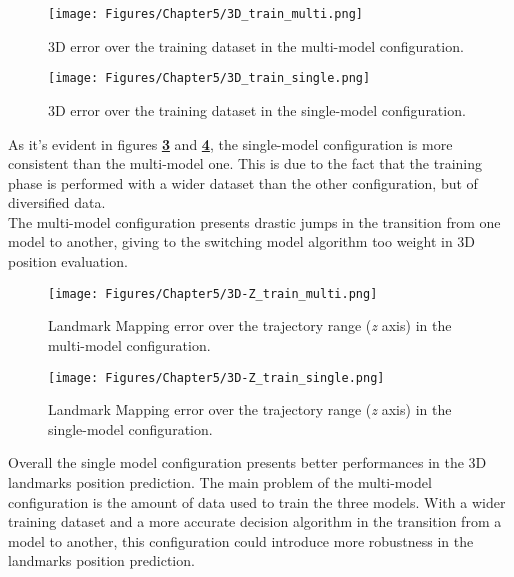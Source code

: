\begin{figure}[H]
    \centering
    \texttt{[image: Figures/Chapter5/3D\_train\_multi.png]}
    \caption[Landmark Mapping error multi-model configuration.]{3D error over the training dataset in the multi-model configuration.}
    \label{fig:3D train multi}
\end{figure}
\begin{figure}[H]
    \centering
    \texttt{[image: Figures/Chapter5/3D\_train\_single.png]}
    \caption[Landmark Mapping error single-model configuration.]{3D error over the training dataset in the single-model configuration.}
    \label{fig:3D train single}
\end{figure}
\newpage
As it's evident in figures \textbf{\ref{fig:3D-Z train multi}} and \textbf{\ref{fig:3D-Z train single}}, the single-model configuration is more consistent than the multi-model one. This is due to the fact that the training phase is performed with a wider dataset than the other configuration, but of diversified data.\\
The multi-model configuration presents drastic jumps in the transition from one model to another, giving to the switching model algorithm too weight in 3D position evaluation.
\begin{figure}[H]
    \centering
    \texttt{[image: Figures/Chapter5/3D-Z\_train\_multi.png]}
    \caption[Landmark Mapping error over the trajectory range in multi-model configuration.]{Landmark Mapping error over the trajectory range (\textit{z} axis) in the multi-model configuration.}
    \label{fig:3D-Z train multi}
\end{figure}

\begin{figure}[H]
    \centering
    \texttt{[image: Figures/Chapter5/3D-Z\_train\_single.png]}
    \caption[Landmark Mapping error over the trajectory range in single-model configuration.]{Landmark Mapping error over the trajectory range (\textit{z} axis) in the single-model configuration.}
    \label{fig:3D-Z train single}
\end{figure}
\newpage
Overall the single model configuration presents better performances in the 3D landmarks position prediction. The main problem of the multi-model configuration is the amount of data used to train the three models. With a wider training dataset and a more accurate decision algorithm in the transition from a model to another, this configuration could introduce more robustness in the landmarks position prediction.

